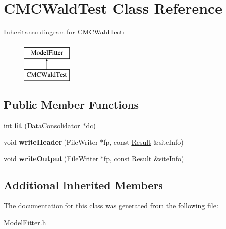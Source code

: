 \hypertarget{classCMCWaldTest}{\section{C\-M\-C\-Wald\-Test Class Reference}
\label{classCMCWaldTest}
}
Inheritance diagram for C\-M\-C\-Wald\-Test\-:\begin{figure}[H]
\begin{center}
\leavevmode
\includegraphics[height=2.000000cm]{classCMCWaldTest}
\end{center}
\end{figure}
\subsection*{Public Member Functions}
\begin{DoxyCompactItemize}
\item 
\hypertarget{classCMCWaldTest_abfa00f4336a872e6fc1354e9ba0bfe24}{int {\bfseries fit} (\hyperlink{classDataConsolidator}{Data\-Consolidator} $\ast$dc)}\label{classCMCWaldTest_abfa00f4336a872e6fc1354e9ba0bfe24}

\item 
\hypertarget{classCMCWaldTest_a2022762ee9ce5c3653b235b8041d9c4f}{void {\bfseries write\-Header} (File\-Writer $\ast$fp, const \hyperlink{classResult}{Result} \&site\-Info)}\label{classCMCWaldTest_a2022762ee9ce5c3653b235b8041d9c4f}

\item 
\hypertarget{classCMCWaldTest_a003f2de4cb62197adc9ac1de9c7741b8}{void {\bfseries write\-Output} (File\-Writer $\ast$fp, const \hyperlink{classResult}{Result} \&site\-Info)}\label{classCMCWaldTest_a003f2de4cb62197adc9ac1de9c7741b8}

\end{DoxyCompactItemize}
\subsection*{Additional Inherited Members}


The documentation for this class was generated from the following file\-:\begin{DoxyCompactItemize}
\item 
Model\-Fitter.\-h\end{DoxyCompactItemize}
